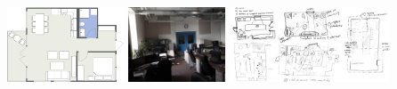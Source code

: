 \documentclass[landscape,final,a0paper,fontscale=0.285]{baposter}
\begin{document}
\begin{poster}
{\begin{multicols}{2}
 \end{multicols}
 
 	
 \begin{center}\includegraphics[height=6em]{img/layout.png}	 
 \includegraphics[height=6em]{img/room.jpg}	
 \includegraphics[height=6em]{img/all_together.png}	
  \end{center}
}


\end{poster}
\end{document}
